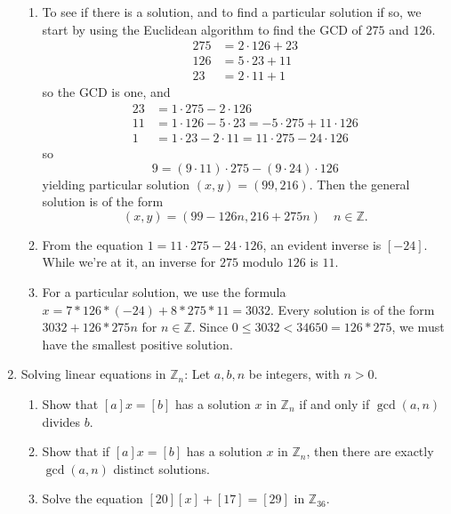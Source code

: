 \documentclass{amsart}
\def\Z{\mathbb Z}
\begin{document}
\begin{enumerate}
\begin{framed}
\begin{enumerate}
\item To see if there is a solution, and to find a particular solution if so, we start by using the Euclidean algorithm to find the GCD of $275$ and $126$.
\[\begin{aligned} 
 275 &= 2 \cdot 126 + 23 \\
 126 &= 5 \cdot 23 + 11 \\
 23 &= 2 \cdot 11 + 1
\end{aligned} \]
so the GCD is one, and
\[\begin{aligned} 
 23 &= 1\cdot 275 -  2 \cdot 126 \\
 11 &= 1 \cdot 126 - 5 \cdot 23 = -5 \cdot 275 + 11 \cdot 126 \\
1 &=  1 \cdot 23 - 2 \cdot 11 = 11 \cdot 275 - 24 \cdot 126
\end{aligned} \]
so 
\[ 9 = (9\cdot 11) \cdot 275 - (9\cdot 24) \cdot 126\]
yielding particular solution $(x,y) = (99,216)$.
Then the general solution is of the form
\[ (x,y) = (99-126n,216+275n) \quad n\in \Z.\]
\item From the equation $1  = 11 \cdot 275 - 24 \cdot 126$, an evident inverse is $[-24]$.
While we're at it, an inverse for $275$ modulo $126$ is $11$.
\item For a particular solution, we use the formula $x = 7*126*(-24) + 8*275*11 = 3032$. Every solution is of the form $3032+ 126*275n$ for $n\in \Z$. Since $0\leq 3032< 34650=126*275$, we must have the smallest positive solution.
\end{enumerate}
\end{framed}

\item  Solving linear equations in $\Z_n$: Let $a,b,n$ be integers, with $n>0$.
\begin{enumerate}
\item Show that $[a] x = [b]$ has a solution $x$ in $\Z_n$ if and only if $\gcd(a,n)$ divides $b$.
\item Show that if $[a] x = [b]$ has a solution $x$ in $\Z_n$, then there are exactly $\gcd(a,n)$ distinct solutions.
\item Solve the equation $[20] [x] + [17] = [29]$ in $\Z_{36}$.
\end{enumerate}


\end{enumerate}
\end{document}
